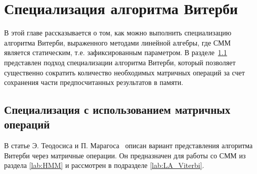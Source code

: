 \section{Специализация алгоритма Витерби}
В этой главе рассказывается о том, как можно выполнить 
специализацию алгоритма Витерби, выраженного методами 
линейной алгебры, где СММ является статическим, т.е. 
зафиксированным параметром.
В разделе~\ref{lab:LA_spec} представлен подход специализации 
алгоритма Витерби, который позволяет существенно сократить 
количество необходимых матричных операций за счет сохранения 
части предпосчитанных результатов в памяти.

\subsection{Специализация с использованием матричных\\ операций}
\label{lab:LA_spec}
В статье Э. Теодосиса и П. Марагоса~\cite{LA_Viterbi} описан 
вариант представления алгоритма Витерби через матричные 
операции.
Он предназначен для работы со СММ из раздела 
\ref{lab:HMM} и рассмотрен в подразделе 
\ref{lab:LA_Viterbi}.


